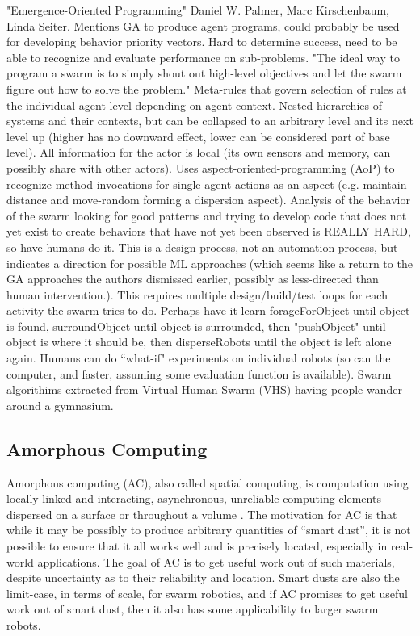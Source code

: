 \documentclass[]{article}
\begin{document}
"Emergence-Oriented Programming" \cite{palmer2005emergence} Daniel W. Palmer, Marc Kirschenbaum, Linda Seiter. Mentions GA to produce agent programs, could probably be used for developing behavior priority vectors. Hard to determine success, need to be able to recognize and evaluate performance on sub-problems. "The ideal way to program a swarm is to simply shout out high-level objectives and let the swarm figure out how to solve the problem." Meta-rules that govern selection of rules at the individual agent level depending on agent context. Nested hierarchies of systems and their contexts, but can be collapsed to an arbitrary level and its next level up (higher has no downward effect, lower can be considered part of base level). All information for the actor is local (its own sensors and memory, can possibly share with other actors). Uses aspect-oriented-programming (AoP) to recognize method invocations for single-agent actions as an aspect (e.g. maintain-distance and move-random forming a dispersion aspect). Analysis of the behavior of the swarm looking for good patterns and trying to develop code that does not yet exist to create behaviors that have not yet been observed is REALLY HARD, so have humans do it. This is a design process, not an automation process, but indicates a direction for possible ML approaches (which seems like a return to the GA approaches the authors dismissed earlier, possibly as less-directed than human intervention.). This requires multiple design/build/test loops for each activity the swarm tries to do. Perhaps have it learn forageForObject until object is found, surroundObject until object is surrounded, then "pushObject" until object is where it should be, then disperseRobots until the object is left alone again. Humans can do ``what-if" experiments on individual robots (so can the computer, and faster, assuming some evaluation function is available). Swarm algorithims extracted from Virtual Human Swarm (VHS) having people wander around a gymnasium. 

\subsection{Amorphous Computing}

Amorphous computing (AC), also called spatial computing, is computation using locally-linked and interacting, asynchronous, unreliable computing elements dispersed on a surface or throughout a volume \cite{abelson2000amorphous}. 
The motivation for AC is that while it may be possibly to produce arbitrary quantities of ``smart dust'', it is not possible to ensure that it all works well and is precisely located, especially in real-world applications.
The goal of AC is to get useful work out of such materials, despite uncertainty as to their reliability and location. 
Smart dusts are also the limit-case, in terms of scale, for swarm robotics, and if AC promises to get useful work out of smart dust, then it also has some applicability to larger swarm robots.
\end{document}
